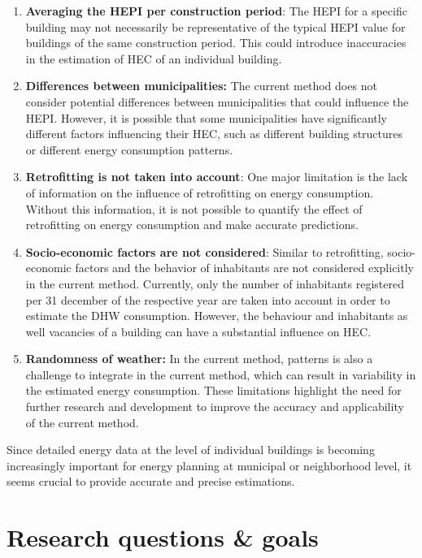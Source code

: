 \documentclass[
  letterpaper,
  DIV=11,
  numbers=noendperiod]{scrreprt}
\providecommand{\tightlist}{%
  \setlength{\itemsep}{0pt}\setlength{\parskip}{0pt}}\usepackage{longtable,booktabs,array}
\begin{document}
\begin{enumerate}
\def\labelenumi{\arabic{enumi}.}
\tightlist
\item
  \textbf{Averaging the HEPI per construction period}: The HEPI for a
  specific building may not necessarily be representative of the typical
  HEPI value for buildings of the same construction period. This could
  introduce inaccuracies in the estimation of HEC of an individual
  building.
\item
  \textbf{Differences between municipalities:} The current method does
  not consider potential differences between municipalities that could
  influence the HEPI. However, it is possible that some municipalities
  have significantly different factors influencing their HEC, such as
  different building structures or different energy consumption
  patterns.
\item
  \textbf{Retrofitting is not taken into account}: One major limitation
  is the lack of information on the influence of retrofitting on energy
  consumption. Without this information, it is not possible to quantify
  the effect of retrofitting on energy consumption and make accurate
  predictions.
\item
  \textbf{Socio-economic factors are not considered}: Similar to
  retrofitting, socio-economic factors and the behavior of inhabitants
  are not considered explicitly in the current method. Currently, only
  the number of inhabitants registered per 31 december of the respective
  year are taken into account in order to estimate the DHW consumption.
  However, the behaviour and inhabitants as well vacancies of a building
  can have a substantial influence on HEC.
\item
  \textbf{Randomness of weather:} In the current method, patterns is
  also a challenge to integrate in the current method, which can result
  in variability in the estimated energy consumption. These limitations
  highlight the need for further research and development to improve the
  accuracy and applicability of the current method.
\end{enumerate}

Since detailed energy data at the level of individual buildings is
becoming increasingly important for energy planning at municipal or
neighborhood level, it seems crucial to provide accurate and precise
estimations.

\hypertarget{sec-research-questions--goals}{%
\section{Research questions \&
goals}\label{sec-research-questions--goals}}
\end{document}
